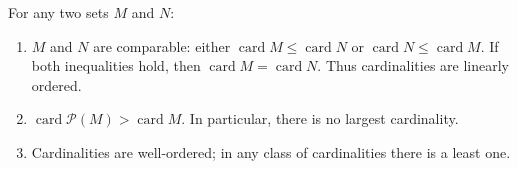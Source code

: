 For any two sets $M$ and $N$:
\begin{enumerate}
\item[(a)] $M$ and $N$ are comparable: either $\operatorname{card} M \leq \operatorname{card} N$ or $\operatorname{card} N \leq \operatorname{card} M$. If both inequalities hold, then $\operatorname{card} M = \operatorname{card} N$. Thus cardinalities are linearly ordered.
\item[(b)] $\operatorname{card} \mathcal{P}(M) > \operatorname{card} M$. In particular, there is no largest cardinality.
\item[(c)] Cardinalities are well-ordered; in any class of cardinalities there is a least one.
\end{enumerate}
